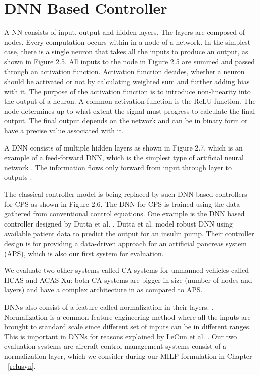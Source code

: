 \section{DNN Based Controller}
\label{apsdnn}


A \ac{NN} consists of input, output and hidden layers. 
The layers are composed of nodes. Every computation occurs within in a node of a network.
In the simplest case, there is a single neuron that takes all the inputs to produce an output, as shown in Figure 2.5. 
All inputs to the node in Figure 2.5 are summed and  passed through an activation function. 
Activation function decides, whether a neuron should be activated or not by calculating weighted sum and further adding bias with it. The purpose of the activation function is to introduce non-linearity into the output of a neuron.
A common activation function is the \ac{ReLU} function. 
The node determines up to what extent the signal must progress to calculate the final output. 
The final output depends on the network and can be in binary form or have a precise value associated with it. 


A \ac{DNN} consists of multiple hidden layers as shown in Figure 2.7, which is an example of a feed-forward \ac{DNN}, which is the simplest type of artificial neural network \cite{feedforward}.
The information flows only forward from input through layer to outputs \cite{Zell}. 

The classical controller model is being replaced by such DNN based controllers for CPS as shown in  Figure 2.6.
The \ac{DNN} for \ac*{CPS} is trained using the data gathered from conventional control equations. 
One example is the DNN based controller designed by Dutta et al. \cite{Dutta_Others__2018__Robust}. 
Dutta et al. model robust DNN using available patient data to predict the output for an insulin pump.
Their controller design is for providing a data-driven approach for an artificial pancreas system (APS), which is also our first system for evaluation. 

We evaluate two other systems called \ac{CA} systems for unmanned vehicles \cite{7778055} called \ac{HCAS} and \ac{ACAS-Xu}: both \ac{CA} systems are bigger in size (number of nodes and layers) and have a complex architecture in as compared to \ac{APS}.


\ac{DNN}s also consist of a feature called normalization in their layers. . 
Normalization is a common feature engineering method where all the inputs are brought to standard scale since different set of inputs can be in different ranges. 
This is important in \ac{DNN}s for reasons explained by  LeCun et al.  \cite{10.5555/645754.668382}.
Our two evaluation systems are aircraft  control management systems \cite{10.1007/978-3-319-63387-9_5} consist of a normalization layer, 
which we consider during our \ac{MILP} formulation in Chapter ~\ref{relusyn}.

